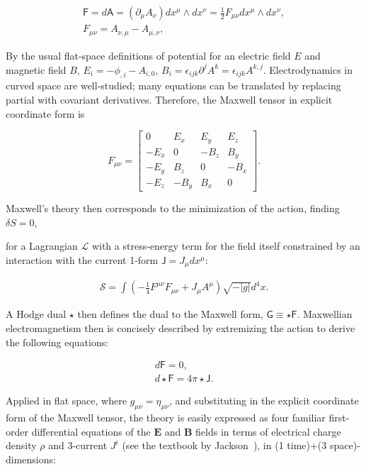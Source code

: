 \begin{eqnarray}
\textsf{F} = d \textsf{A} = (\partial_\mu A_\nu) dx^\mu \wedge dx^\nu = \frac{1}{2} F_{\mu\nu} dx^\mu \wedge dx^\nu, \\
F_{\mu \nu} = A_{\nu,\mu} - A_{\mu,\nu},
\end{eqnarray}

By the usual flat-space definitions of potential for an electric field $E$ and magnetic field $B$, $E_i = -\phi_{,i} - A_{i,0}$, $B_i = \epsilon_{ijk} \partial^j A^k = \epsilon_{ijk} A^{k, j}$. 
Electrodynamics in curved space are well-studied; many equations can be translated by replacing partial with covariant derivatives.
Therefore, the Maxwell tensor in explicit coordinate form is

\begin{equation}
F_{\mu\nu} =
\left[
\begin{array}{cccc}
0 & E_x & E_y & E_z\\
-E_x & 0 & -B_z & B_y \\
-E_y & B_z & 0 & -B_x\\
-E_z & -B_y & B_x & 0
\end{array} \right].
\end{equation}

\noindent Maxwell's theory then corresponds to the minimization of the action, finding $\delta S = 0$,


\noindent for a Lagrangian $\mathcal{L}$ with a stress-energy term for the field itself constrained by an interaction with the current 1-form $\textsf{J} = J_\mu d x^\mu$:

\begin{eqnarray}
\mathcal{S} = \int \left( -\frac{1}{4} F^{\mu \nu} F_{\mu \nu} + J_\mu A^\mu \right) \sqrt{-|g|}d^4 x.
\end{eqnarray}

A Hodge dual $\star$ then defines the dual to the Maxwell form, $\textsf{G} \equiv \star \textsf{F}$. 
Maxwellian electromagnetism then is concisely described by extremizing the action to derive the following equations:

\begin{eqnarray}
d \textsf{F} = 0,\\
d \star \textsf{F} = 4 \pi \star \textsf{J}.
\end{eqnarray}  

Applied in flat space, where $g_{\mu \nu} = \eta_{\mu \nu}$, and substituting in the explicit coordinate form of the Maxwell tensor, the theory is easily expressed as four familiar first-order differential equations of the $\textbf{E}$ and $\textbf{B}$ fields in terms of electrical charge density $\rho$ and 3-current $J^i$ (see the textbook by Jackson~\cite{JacksonEM}), in (1 time)+(3 space)-dimensions:
 
